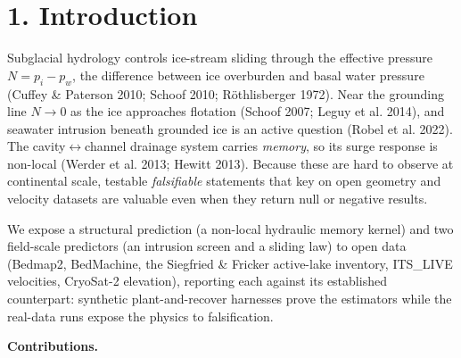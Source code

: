 \documentclass[11pt]{article}
\begin{document}
\begin{abstract}
\textbf{operationalizes}, for ungrounding, the critical-slowing-down indicators already established for marine-ice-sheet tipping (Scheffer et al. 2009; Dakos et al. 2008; Rosier et al. 2021). Synthetic plant-and-recover harnesses calibrate every estimator. The contributions are the exact MZ certification, the falsifiable-forecast discipline, and a field-measurable sliding law — not a verified intrusion forecast or a new early-warning.


\end{abstract}


\section*{1. Introduction}


Subglacial hydrology controls ice-stream sliding through the effective pressure $N=p_{i}-p_{w}$, the difference between ice overburden and basal water pressure (Cuffey \& Paterson 2010; Schoof 2010; Röthlisberger 1972). Near the grounding line $N\to 0$ as the ice approaches flotation (Schoof 2007; Leguy et al. 2014), and seawater intrusion beneath grounded ice is an active question (Robel et al. 2022). The cavity\ensuremath{\leftrightarrow}channel drainage system carries \emph{memory}, so its surge response is non-local (Werder et al. 2013; Hewitt 2013). Because these are hard to observe at continental scale, testable \emph{falsifiable} statements that key on open geometry and velocity datasets are valuable even when they return null or negative results.


We expose a structural prediction (a non-local hydraulic memory kernel) and two field-scale predictors (an intrusion screen and a sliding law) to open data (Bedmap2, BedMachine, the Siegfried \& Fricker active-lake inventory, ITS\_LIVE velocities, CryoSat-2 elevation), reporting each against its established counterpart: synthetic plant-and-recover harnesses prove the estimators while the real-data runs expose the physics to falsification.


\textbf{Contributions.}
\end{document}

